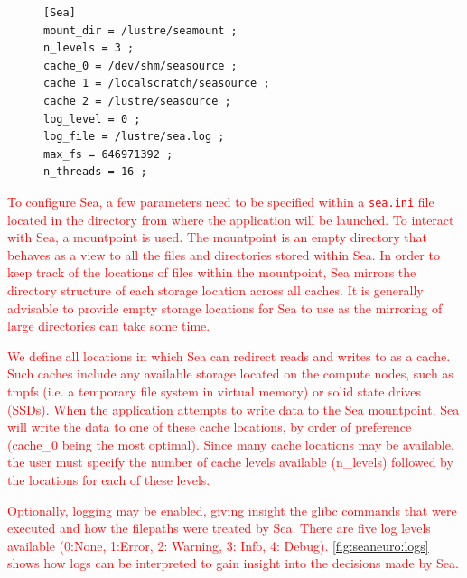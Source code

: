 \documentclass[pdflatex,sn-mathphys-num]{sn-jnl}
\newcommand{\vhs}[1]{\textcolor{red}{#1}}
\theoremstyle{thmstyleone}%
\theoremstyle{thmstyletwo}%
\theoremstyle{thmstylethree}%
\begin{document}
    \begin{figure}
      \centering
       \begin{lstlisting}[style=myyamlstyle, caption={Example Sea configuration file (sea.ini)}, label=lst:seaini]
[Sea]                                                                  
mount_dir = /lustre/seamount ;                                    
n_levels = 3 ;                                                        
cache_0 = /dev/shm/seasource ;                                           
cache_1 = /localscratch/seasource ;                                         
cache_2 = /lustre/seasource ;                                    
log_level = 0 ;                                 
log_file = /lustre/sea.log ;                             
max_fs = 646971392 ;                                                   
n_threads = 16 ;    \end{lstlisting}
    \end{figure}
   

    \vhs{To configure Sea, a few parameters need to be specified within a \texttt{sea.ini} file located in the directory from where the application will be launched. To interact with Sea, a mountpoint is used. The mountpoint
    is an empty directory that behaves as a view to all the files and
    directories stored within Sea. In order to keep track of the locations of
    files within the mountpoint, Sea mirrors the directory structure of each
    storage location across all caches. It is generally advisable to provide
    empty storage locations for Sea to use as the mirroring of large directories
    can take some time.}

    \vhs{We define all locations in which Sea can redirect reads and  writes to as a cache. Such
    caches include any available storage located on the compute nodes, such as
    tmpfs (i.e. a temporary file system in virtual memory) or solid state drives (SSDs). When the application attempts to write
    data to the Sea mountpoint, Sea will write the data to one of these cache locations, by order of preference (cache\_0 being the most optimal).
    Since many cache locations may be available, the user must specify the number of cache levels available (n\_levels) followed by the locations for each of these levels.}

    \vhs{Optionally, logging may be enabled, giving insight the glibc commands that were executed and how the filepaths were treated by Sea. There are five log levels
    available (0:None, 1:Error, 2: Warning, 3: Info, 4: Debug). \autoref{fig:seaneuro:logs} shows how logs can be interpreted to gain insight into the decisions made by Sea.}
\end{document}
